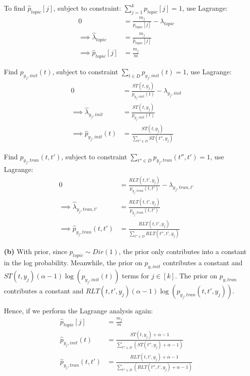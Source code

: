 \documentclass[a4paper, 11pt]{article}
\begin{document}
\begin{problem}
To find $\hat{p}_{topic}[j]$, subject to constraint: $\sum_{j=1}^{k} p_{topic}[j] = 1$, use Lagrange:
\begin{align*}
    0 &= \frac{m_j}{p_{topic}[j]} - \lambda_{topic} \\
    \implies \hat{\lambda}_{topic} &= \frac{m_j}{\hat{p}_{topic}[j]} \\
    \implies \hat{p}_{topic}[j] &= \frac{m_j}{m}
\end{align*}

Find $p_{y_j, init}(t)$, subject to constraint $\sum_{t \in D} p_{y_j, init}(t) = 1$, use Lagrange:
\begin{align*}
    0 &= \frac{ST(t, y_j)}{p_{y_j, init}(t)} - \lambda_{y_j, init} \\
    \implies \hat{\lambda}_{y_j, init} &= \frac{ST(t, y_j)}{p_{y_j, init}(t)} \\
    \implies \hat{p}_{y_j, init}(t) &= \frac{ST(t, y_j)}{\sum_{t'' \in D} ST(t'', y_j)}
\end{align*}

Find $p_{y_j, tran}(t, t')$, subject to constraint $\sum_{t'' \in D} p_{y_j, tran}(t'', t') = 1$, use Lagrange: \begin{align*}
0 &= \frac{RLT(t, t', y_j)}{p_{y_j, tran}(t, t')} - \lambda_{y_j, tran, t'} \\
\implies  \hat{\lambda}_{y_j, tran, t'} &= \frac{RLT(t, t', y_j)}{p_{y_j, tran}(t, t')} \\
\implies \hat{p}_{y_j, tran}(t, t') &= \frac{RLT(t, t', y_j)}{\sum_{t'' \in D} RLT(t'', t', y_j)}
\end{align*}

\textbf{(b)} With prior, since $p_{topic} \sim Dir(1)$, the prior only contributes into a constant in the log probability. Meanwhile, the prior on $p_{y, init}$ contributes a constant and $ST(t, y_j) (\alpha - 1) \log(p_{y_j, init}(t))$ terms for $j \in [k]$. The prior on $p_{y, tran}$ contributes a constant and $RLT(t, t', y_j) (\alpha - 1) \log(p_{y_j, tran}(t, t', y_j))$.

Hence, if we perform the Lagrange analysis again:
\begin{align*}
\hat{p}_{topic}[j] &= \frac{m_j}{m} \\
\hat{p}_{y_j, init}(t) &= \frac{ST(t, y_j) + \alpha - 1}{\sum_{t'' \in D}(ST(t'', y_j) + \alpha - 1)} \\
\hat{p}_{y_j, tran}(t, t') &= \frac{RLT(t, t', y_j) + \alpha -1 }{\sum_{t'' \in D} (RLT(t'', t', y_j) + \alpha -1) }
\end{align*}


\end{problem}
\end{document}
